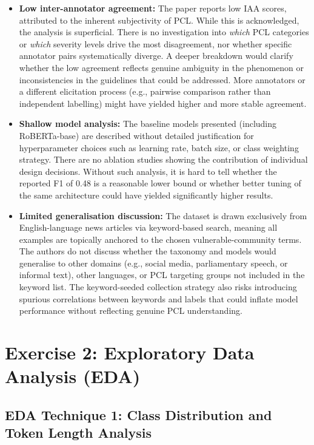 \documentclass[11pt]{article}
\begin{document}
\begin{itemize}
    \item \textbf{Low inter-annotator agreement:} The paper reports low IAA scores, attributed to the inherent subjectivity of PCL. While this is acknowledged, the analysis is superficial. There is no investigation into \emph{which} PCL categories or \emph{which} severity levels drive the most disagreement, nor whether specific annotator pairs systematically diverge. A deeper breakdown would clarify whether the low agreement reflects genuine ambiguity in the phenomenon or inconsistencies in the guidelines that could be addressed. More annotators or a different elicitation process (e.g., pairwise comparison rather than independent labelling) might have yielded higher and more stable agreement.

    \item \textbf{Shallow model analysis:} The baseline models presented (including RoBERTa-base) are described without detailed justification for hyperparameter choices such as learning rate, batch size, or class weighting strategy. There are no ablation studies showing the contribution of individual design decisions. Without such analysis, it is hard to tell whether the reported F1 of 0.48 is a reasonable lower bound or whether better tuning of the same architecture could have yielded significantly higher results.

    \item \textbf{Limited generalisation discussion:} The dataset is drawn exclusively from English-language news articles via keyword-based search, meaning all examples are topically anchored to the chosen vulnerable-community terms. The authors do not discuss whether the taxonomy and models would generalise to other domains (e.g., social media, parliamentary speech, or informal text), other languages, or PCL targeting groups not included in the keyword list. The keyword-seeded collection strategy also risks introducing spurious correlations between keywords and labels that could inflate model performance without reflecting genuine PCL understanding.
\end{itemize}

\clearpage
\section{Exercise 2: Exploratory Data Analysis (EDA)}
\label{sec:eda}

\subsection{EDA Technique 1: Class Distribution and Token Length Analysis}
\end{document}
